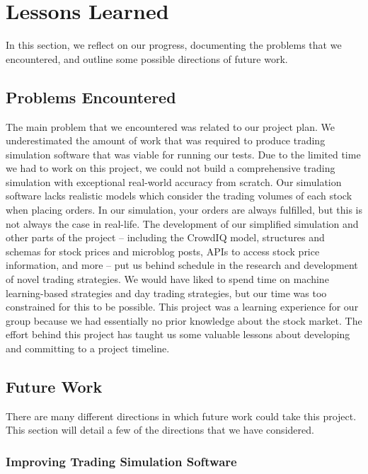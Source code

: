 \section{Lessons Learned}

In this section, we reflect on our progress, documenting the problems that we encountered, and outline some possible directions of future work.

\subsection{Problems Encountered}

The main problem that we encountered was related to our project plan.
We underestimated the amount of work that was required to produce trading simulation software that was viable for running our tests.
Due to the limited time we had to work on this project, we could not build a comprehensive trading simulation with exceptional real-world accuracy from scratch.
Our simulation software lacks realistic models which consider the trading volumes of each stock when placing orders.
In our simulation, your orders are always fulfilled, but this is not always the case in real-life.
The development of our simplified simulation and other parts of the project -- including the CrowdIQ model, structures and schemas for stock prices and microblog posts, APIs to access stock price information, and more -- put us behind schedule in the research and development of novel trading strategies.
We would have liked to spend time on machine learning-based strategies and day trading strategies, but our time was too constrained for this to be possible.
This project was a learning experience for our group because we had essentially no prior knowledge about the stock market.
The effort behind this project has taught us some valuable lessons about developing and committing to a project timeline.

\subsection{Future Work}

There are many different directions in which future work could take this project.
This section will detail a few of the directions that we have considered.

\subsubsection{Improving Trading Simulation Software}

